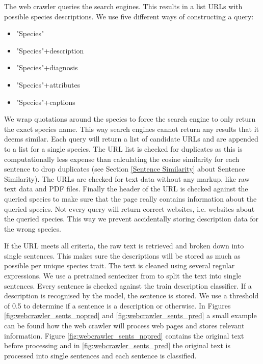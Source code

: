 \documentclass[a4paper, 12pt, oneside]{book} %
\begin{document}
The web crawler queries the search engines. 
This results in a list URLs with possible species descriptions.
We use five different ways of constructing a query:
\begin{itemize}
    \item "Species"
    \item "Species"+description
    \item "Species"+diagnosis
    \item "Species"+attributes
    \item "Species"+captions
\end{itemize}
We wrap quotations around the species to force the search engine to only return the exact species name. This way search engines cannot return any results that it deems similar.
Each query will return a list of candidate URLs and are appended to a list for a single species.
The URL list is checked for duplicates as this is computationally less expense than calculating the cosine similarity for each sentence to drop duplicates (see Section \ref{Sentence Similarity} about Sentence Similarity).
The URLs are checked for text data without any markup, like raw text data and PDF files.
Finally the header of the URL is checked against the queried species to make sure that the page really contains information about the queried species.
Not every query will return correct websites, i.e. websites about the queried species.
This way we prevent accidentally storing description data for the wrong species.

If the URL meets all criteria, the raw text is retrieved and broken down into single sentences. 
This makes sure the descriptions will be stored as much as possible per unique species trait.
The text is cleaned using several regular expressions. %
We use a pretrained sentecizer from \textcite{wolf_huggingfaces_2020} to split the text into single sentences.
Every sentence is checked against the train description classifier.
If a description is recognised by the model, the sentence is stored.
We use a threshold of 0.5 to determine if a sentence is a description or otherwise.
In Figures \ref{fig:webcrawler_sents_nopred} and \ref{fig:webcrawler_sents_pred} a small example can be found how the web crawler will process web pages and stores relevant information. 
Figure \ref{fig:webcrawler_sents_nopred} contains the original text before processing and in \ref{fig:webcrawler_sents_pred} the original text is processed into single sentences and each sentence is classified.
\end{document}
